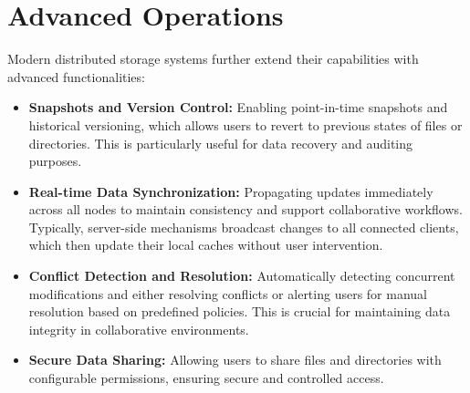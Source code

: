 \section{Advanced Operations}
Modern distributed storage systems further extend their capabilities with advanced functionalities:
\begin{itemize}
    \item \textbf{Snapshots and Version Control:} Enabling point-in-time snapshots and historical versioning, which allows users to revert to previous states of files or directories. This is particularly useful for data recovery and auditing purposes.
    \item \textbf{Real-time Data Synchronization:} Propagating updates immediately across all nodes to maintain consistency and support collaborative workflows. Typically, server-side mechanisms broadcast changes to all connected clients, which then update their local caches without user intervention.
    \item \textbf{Conflict Detection and Resolution:} Automatically detecting concurrent modifications and either resolving conflicts or alerting users for manual resolution based on predefined policies. This is crucial for maintaining data integrity in collaborative environments.
    \item \textbf{Secure Data Sharing:} Allowing users to share files and directories with configurable permissions, ensuring secure and controlled access.
\end{itemize}

